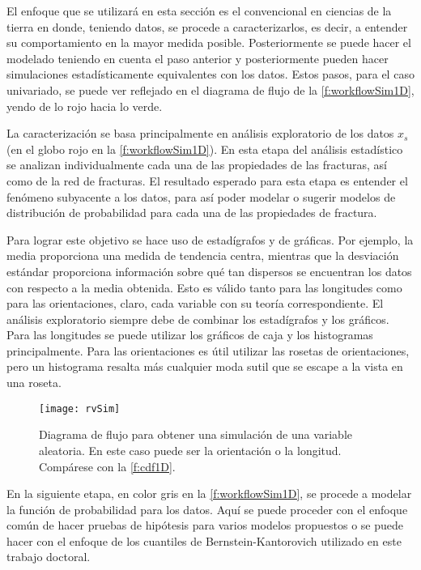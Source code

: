 El enfoque que se utilizar\'a en esta secci\'on es el convencional en ciencias de la tierra en donde, teniendo datos, se procede a caracterizarlos, es decir, a entender su comportamiento en la mayor medida posible. Posteriormente se puede hacer el modelado teniendo en cuenta el paso anterior y posteriormente pueden hacer simulaciones estad\'isticamente equivalentes con los datos. Estos pasos, para el caso univariado, se puede ver reflejado en el diagrama de flujo de la \autoref{f:workflowSim1D}, yendo de lo rojo hacia lo verde.

La caracterizaci\'on se basa principalmente en an\'alisis exploratorio de los datos $x_s$ (en el globo rojo en la \autoref{f:workflowSim1D}). En esta etapa del an\'alisis estad\'istico se analizan individualmente cada una de las propiedades de las fracturas, as\'i como de la red de fracturas. El resultado esperado para esta etapa es entender el fen\'omeno subyacente a los datos, para as\'i poder modelar o sugerir modelos de distribuci\'on de probabilidad para cada una de las propiedades de fractura.

Para lograr este objetivo se hace uso de estad\'igrafos y de gr\'aficas. Por ejemplo, la media proporciona una medida de tendencia centra, mientras que la desviaci\'on est\'andar proporciona informaci\'on sobre qu\'e tan dispersos se encuentran los datos con respecto a la media obtenida. Esto es v\'alido tanto para las longitudes como para las orientaciones, claro, cada variable con su teor\'ia correspondiente. El an\'alisis exploratorio siempre debe de combinar los estad\'igrafos y los gr\'aficos. Para las longitudes se puede utilizar los gr\'aficos de caja y los histogramas principalmente. Para las orientaciones es \'util utilizar las rosetas de orientaciones, pero un histograma resalta m\'as cualquier moda sutil que se escape a la vista en una roseta.

\begin{figure}[H]
	\centering
	\texttt{[image: rvSim]}
	\caption{Diagrama de flujo para obtener una simulaci\'on de una variable aleatoria. En este caso puede ser la orientaci\'on o la longitud. Comp\'arese con la \autoref{f:cdf1D}.}
\label{f:workflowSim1D}
\end{figure}

En la siguiente etapa, en color gris en la \autoref{f:workflowSim1D}, se procede a modelar la funci\'on de probabilidad para los datos. Aqu\'i se puede proceder con el enfoque com\'un de hacer pruebas de hip\'otesis para varios modelos propuestos o se puede hacer con el enfoque de los cuantiles de Bernstein-Kantorovich utilizado en este trabajo doctoral.

